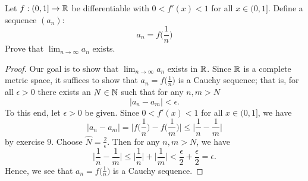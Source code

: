 \documentclass[a4paper]{article}
\begin{document}
\begin{problem}
    Let \( f: (0,1] \to \mathbb{R}  \) be differentiable with \( 0 < f'(x) < 1  \) for all \( x \in (0,1] \). Define a sequence \( ({a}_{n}) \):
    \[  {a}_{n} = f \Big(  \frac{ 1 }{ n }  \Big) \]
    Prove that \( \lim_{ n \to \infty  } {a}_{n}  \) exists.
\end{problem}

\begin{proof}
    Our goal is to show that \( \lim_{ n \to \infty  } {a}_{n} \) exists in \( \mathbb{R}  \). Since \( \mathbb{R}  \) is a complete metric space, it suffices to show that \( {a}_{n} = f \Big(  \frac{ 1 }{ n }  \Big) \) is a Cauchy sequence; that is, for all \( \epsilon > 0  \) there exists an \( N \in \mathbb{N}  \) such that for any \( n,m > N \)
    \[  | {a}_{n} - {a}_{m} | < \epsilon.   \]
    To this end, let \( \epsilon > 0  \) be given. Since \( 0 < f'(x) < 1 \) for all \( x \in (0,1] \), we have    
    \[  | {a}_{n} - {a}_{m} |  = \Big| f \Big(  \frac{ 1 }{ n }  \Big) - f \Big(  \frac{ 1 }{ m }  \Big) \Big| \leq \Big| \frac{ 1 }{ n }  - \frac{ 1 }{ m }  \Big| \]
    by exercise 9.
            Choose \( \hat{N} = \frac{ 2 }{ \epsilon }  \). Then for any \( n,m > N  \), we have  
            \[  \Big| \frac{ 1 }{ n }  - \frac{ 1 }{ m }  \Big| \leq \Big| \frac{ 1 }{ n }  \Big|  + \Big| \frac{ 1 }{ m }  \Big|  < \frac{ \epsilon }{ 2 } + \frac{ \epsilon }{ 2 } = \epsilon.  \]
            Hence, we see that \( {a}_{n} = f \Big(  \frac{ 1 }{ n }  \Big) \) is a Cauchy sequence.
\end{proof}
\end{document}
